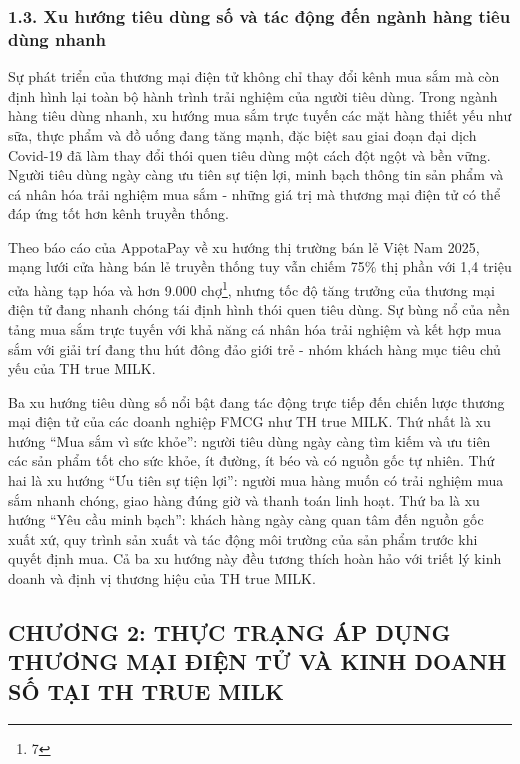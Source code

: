 \subsubsection{1.3. Xu hướng tiêu dùng số và tác động đến ngành hàng
tiêu dùng
nhanh}\label{xu-hux1b0ux1edbng-tiuxeau-duxf9ng-sux1ed1-vuxe0-tuxe1c-ux111ux1ed9ng-ux111ux1ebfn-nguxe0nh-huxe0ng-tiuxeau-duxf9ng-nhanh}

Sự phát triển của thương mại điện tử không chỉ thay đổi kênh mua sắm mà
còn định hình lại toàn bộ hành trình trải nghiệm của người tiêu dùng.
Trong ngành hàng tiêu dùng nhanh, xu hướng mua sắm trực tuyến các mặt
hàng thiết yếu như sữa, thực phẩm và đồ uống đang tăng mạnh, đặc biệt
sau giai đoạn đại dịch Covid-19 đã làm thay đổi thói quen tiêu dùng một
cách đột ngột và bền vững. Người tiêu dùng ngày càng ưu tiên sự tiện
lợi, minh bạch thông tin sản phẩm và cá nhân hóa trải nghiệm mua sắm -
những giá trị mà thương mại điện tử có thể đáp ứng tốt hơn kênh truyền
thống.

Theo báo cáo của AppotaPay về xu hướng thị trường bán lẻ Việt Nam 2025,
mạng lưới cửa hàng bán lẻ truyền thống tuy vẫn chiếm 75\% thị phần với
1,4 triệu cửa hàng tạp hóa và hơn 9.000 chợ\footnote{7}, nhưng tốc độ
tăng trưởng của thương mại điện tử đang nhanh chóng tái định hình thói
quen tiêu dùng. Sự bùng nổ của nền tảng mua sắm trực tuyến với khả năng
cá nhân hóa trải nghiệm và kết hợp mua sắm với giải trí đang thu hút
đông đảo giới trẻ - nhóm khách hàng mục tiêu chủ yếu của TH true MILK.

Ba xu hướng tiêu dùng số nổi bật đang tác động trực tiếp đến chiến lược
thương mại điện tử của các doanh nghiệp FMCG như TH true MILK. Thứ nhất
là xu hướng ``Mua sắm vì sức khỏe'': người tiêu dùng ngày càng tìm kiếm
và ưu tiên các sản phẩm tốt cho sức khỏe, ít đường, ít béo và có nguồn
gốc tự nhiên. Thứ hai là xu hướng ``Ưu tiên sự tiện lợi'': người mua
hàng muốn có trải nghiệm mua sắm nhanh chóng, giao hàng đúng giờ và
thanh toán linh hoạt. Thứ ba là xu hướng ``Yêu cầu minh bạch'': khách
hàng ngày càng quan tâm đến nguồn gốc xuất xứ, quy trình sản xuất và tác
động môi trường của sản phẩm trước khi quyết định mua. Cả ba xu hướng
này đều tương thích hoàn hảo với triết lý kinh doanh và định vị thương
hiệu của TH true MILK.

\subsection*{CHƯƠNG 2: THỰC TRẠNG ÁP DỤNG THƯƠNG MẠI ĐIỆN TỬ VÀ KINH
DOANH SỐ TẠI TH TRUE
MILK}\label{chux1b0ux1a1ng-2-thux1ef1c-trux1ea1ng-uxe1p-dux1ee5ng-thux1b0ux1a1ng-mux1ea1i-ux111iux1ec7n-tux1eed-vuxe0-kinh-doanh-sux1ed1-tux1ea1i-th-true-milk}

